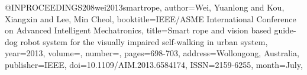 @INPROCEEDINGS{208wei2013smartrope,
author={Wei, Yuanlong and Kou, Xiangxin and Lee, Min Cheol},
booktitle={IEEE/ASME International Conference on Advanced Intelligent Mechatronics}, 
title={Smart rope and vision based guide-dog robot system for the visually impaired self-walking in urban system}, 
year={2013},
volume={},
number={},
pages={698-703},
address={Wollongong, Australia},
publisher={IEEE},
doi={10.1109/AIM.2013.6584174},
ISSN={2159-6255},
month={July},}